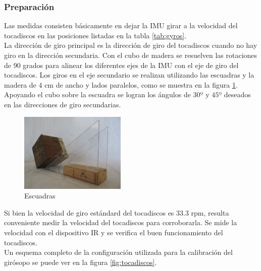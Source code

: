 \documentclass[main]{subfiles}
\begin{document}
\subsubsection*{Preparación}

Las medidas consisten básicamente en dejar la IMU girar a la velocidad del tocadiscos en las posiciones listadas en la tabla \ref{tab:gyros}.\\ 


La dirección de giro principal es la dirección de giro del tocadiscos cuando no hay giro en la dirección secundaria. Con el cubo de madera se resuelven las rotaciones de 90 grados para alinear los diferentes ejes de la IMU con el eje de giro del tocadiscos. Los giros en el eje secundario se realizan utilizando las escuadras y la madera de 4 cm de ancho y lados paralelos, como se muestra en la figura \ref{fig:escuadras}. Apoyando el cubo sobre la escuadra se logran los ángulos de $30º$ y $45º$ deseados en las direcciones de giro secundarias.\\
\begin{figure}
  \vspace{-20pt}
  \begin{center}
    \includegraphics[width=0.45\textwidth]
    	{./pics_gyro/escuadra.jpg}
  \end{center}
  \vspace{-20pt}
  \caption{Escuadras}
  \label{fig:escuadras}
  \vspace{-10pt}
\end{figure}

Si bien la velocidad de giro estándard del tocadiscos es 33.3 rpm, resulta conveniente medir la velocidad del tocadiscos para corroborarla. Se mide la velocidad con el dispositivo IR y se verifica el buen funcionamiento del tocadiscos.\\

Un esquema completo de la configuración utilizada para la calibración del girósopo se puede ver en la figura \ref{fig:tocadiscos}.
\end{document}
